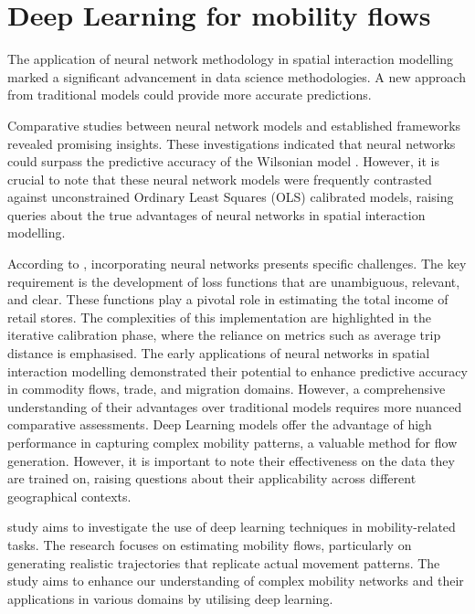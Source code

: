     \section{Deep Learning for mobility flows}

    The application of neural network methodology in spatial interaction modelling marked a significant advancement in data science methodologies. A new approach from traditional models could provide more accurate predictions. \citep{wilkinsonSpatialInteractionModels2023}
        
    Comparative studies between neural network models and established frameworks revealed promising insights. These investigations indicated that neural networks could surpass the predictive accuracy of the Wilsonian model \citep{fischerArtificialNeuralNetworks1994, blackSpatialInteractionModeling1995, wilkinsonSpatialInteractionModels2023}. However, it is crucial to note that these neural network models were frequently contrasted against unconstrained Ordinary Least Squares (OLS) calibrated models, raising queries about the true advantages of neural networks in spatial interaction modelling\citep{mozolinTripDistributionForecasting2000, wilkinsonSpatialInteractionModels2023}.
        
    According to \cite{wilkinsonSpatialInteractionModels2023}, incorporating neural networks presents specific challenges. The key requirement is the development of loss functions that are unambiguous, relevant, and clear. These functions play a pivotal role in estimating the total income of retail stores. The complexities of this implementation are highlighted in the iterative calibration phase, where the reliance on metrics such as average trip distance is emphasised. The early applications of neural networks in spatial interaction modelling demonstrated their potential to enhance predictive accuracy in commodity flows, trade, and migration domains. However, a comprehensive understanding of their advantages over traditional models requires more nuanced comparative assessments. Deep Learning models offer the advantage of high performance in capturing complex mobility patterns, a valuable method for flow generation. However, it is important to note their effectiveness on the data they are trained on, raising questions about their applicability across different geographical contexts.

    \cite{lucaSurveyDeepLearning2021} study aims to investigate the use of deep learning techniques in mobility-related tasks. The research focuses on estimating mobility flows, particularly on generating realistic trajectories that replicate actual movement patterns. The study aims to enhance our understanding of complex mobility networks and their applications in various domains by utilising deep learning.

